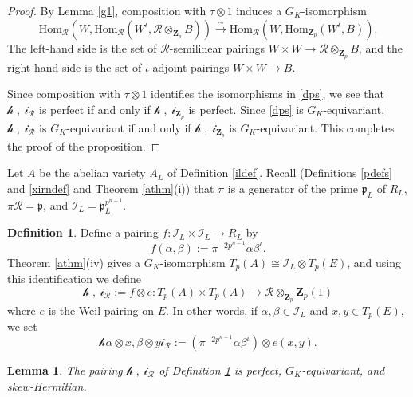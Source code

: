 \documentclass[reqno]{amsart}
\newtheorem{lem}[thm]{Lemma}
\theoremstyle{definition}
\newtheorem{defn}[thm]{Definition}
\def\Z{\mathbf{Z}}
\def\Zp{\Z_p}
\def\cR{\mathcal{R}}
\def\I{\mathcal{I}}
\def\T{W}
\def\ld{\mathcal{h}}
\def\rd{\mathcal{i}}
\def\P{\mathfrak{p}}
\def\Hom{\mathrm{Hom}}
\def\too{\longrightarrow}
\def\isom{\xrightarrow{\sim}}
\def\pair#1#2{\ld#1,#2\rd}
\begin{document}
\begin{proof}
By Lemma \ref{g1}, composition with $\tau \otimes 1$ induces 
a $G_K$-isomorphism
\begin{equation}
\label{dps}
\Hom_{\cR}(\T,\Hom_{\cR}(\T^\iota,\cR \otimes_{\Zp} B)) \isom 
    \Hom_{\cR}(\T,\Hom_{\Zp}(\T^\iota,B)).
\end{equation}
The left-hand side is the set of 
$\cR$-semilinear pairings $\T \times \T \to \cR \otimes_{\Zp} B$,
and the right-hand side is the set of $\iota$-adjoint pairings 
$\T \times \T \to B$.

Since composition with $\tau \otimes 1$ identifies 
the isomorphisms in \eqref{dps}, we see that $\pair{\;}{\;}_\cR$ 
is perfect if and only if $\pair{\;}{\;}_{\Zp}$ is perfect.  Since 
\eqref{dps} is $G_K$-equivariant, $\pair{\;}{\;}_\cR$ 
is $G_K$-equivariant if and only if $\pair{\;}{\;}_{\Zp}$ is $G_K$-equivariant.
This completes the proof of the proposition.
\end{proof}

Let $A$ be the abelian variety $A_L$ of Definition \ref{ildef}.
Recall (Definitions \ref{pdefs} and \ref{xirndef} and Theorem \ref{athm}(i)) 
that $\pi$ is a generator of the prime $\P_L$ of $R_L$, $\pi\cR = \P$, 
and $\I_L = \P_L^{p^{n-1}}$.  

\begin{defn}
\label{lastpair}
Define a pairing $f : \I_L \times \I_L \to R_L$ by 
$$
f(\alpha,\beta) := \pi^{-2p^{n-1}} \alpha \beta^\iota.
$$
Theorem \ref{athm}(iv) gives a $G_{K}$-isomorphism 
$T_p(A) \cong \I_L \otimes T_p(E)$, and using this identification we define
$$
\pair{\;}{\;}_\cR := f \otimes e : T_p(A) \times T_p(A) \too \cR \otimes_{\Zp} \Zp(1)
$$ 
where $e$ is the Weil pairing on $E$.  
In other words, if $\alpha, \beta \in \I_L$ and $x,y \in T_p(E)$, we set
$$
\pair{\alpha \otimes x}{\beta \otimes y}_\cR 
    := (\pi^{-2p^{n-1}} \alpha \beta^\iota) \otimes e(x,y).
$$
\end{defn}

\begin{lem}
\label{lastlem}
The pairing $\pair{\;}{\;}_\cR$ of Definition \ref{lastpair} is perfect, 
$G_K$-equivariant, and skew-Hermitian.
\end{lem}
\end{document}
